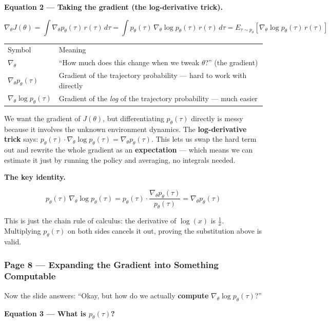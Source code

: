 \medskip
\textbf{Equation 2 --- Taking the gradient (the log-derivative trick).}

\[
  \nabla_\theta J(\theta)
  = \int \nabla_\theta p_\theta(\tau)\,r(\tau)\,d\tau
  = \int p_\theta(\tau)\,\nabla_\theta \log p_\theta(\tau)\,r(\tau)\,d\tau
  = E_{\tau \sim p_\theta}\!\left[\nabla_\theta \log p_\theta(\tau)\,r(\tau)\right]
\]

\begin{tabular}{ll}
  Symbol & Meaning \\[4pt]
  $\nabla_\theta$ & ``How much does this change when we tweak $\theta$?'' (the gradient) \\
  $\nabla_\theta p_\theta(\tau)$ & Gradient of the trajectory probability --- hard to work with directly \\
  $\nabla_\theta \log p_\theta(\tau)$ & Gradient of the \textit{log} of the trajectory probability --- much easier \\
\end{tabular}

\medskip
We want the gradient of $J(\theta)$, but differentiating $p_\theta(\tau)$ directly is messy
because it involves the unknown environment dynamics. The \textbf{log-derivative trick} says:
$p_\theta(\tau)\cdot\nabla_\theta\log p_\theta(\tau) = \nabla_\theta p_\theta(\tau)$.
This lets us swap the hard term out and rewrite the whole gradient as an \textbf{expectation} ---
which means we can estimate it just by running the policy and averaging, no integrals needed.

\medskip
\textbf{The key identity.}

\[
  p_\theta(\tau)\,\nabla_\theta \log p_\theta(\tau)
  = p_\theta(\tau)\cdot\frac{\nabla_\theta p_\theta(\tau)}{p_\theta(\tau)}
  = \nabla_\theta p_\theta(\tau)
\]

This is just the chain rule of calculus: the derivative of $\log(x)$ is $\frac{1}{x}$.
Multiplying $p_\theta(\tau)$ on both sides cancels it out, proving the substitution above is valid.

\subsubsection*{Page 8 --- Expanding the Gradient into Something Computable}

Now the slide answers: ``Okay, but how do we actually \textbf{compute}
$\nabla_\theta\log p_\theta(\tau)$?''

\medskip
\textbf{Equation 3 --- What is $p_\theta(\tau)$?}

